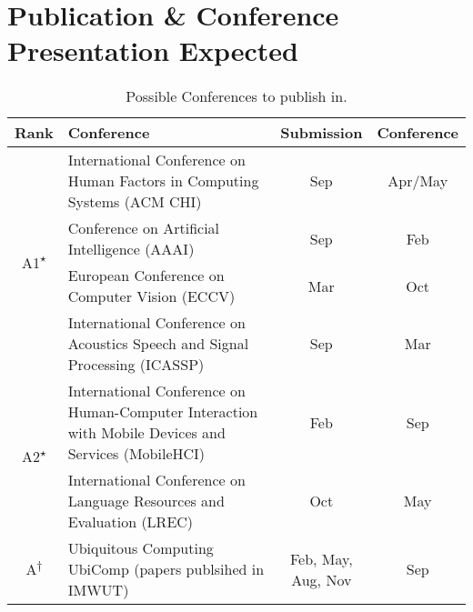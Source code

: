 \section{Publication \& Conference Presentation Expected}


\begin{sidewaystable}[]
\centering
\caption{Possible Conferences to publish in.}
\label{my-label}
\begin{tabular}{c  m{16cm}  c  c}
	\toprule
Rank                              & Conference                                                                                               & Submission         & Conference \\
\midrule
\multirow{4}{*}{A1\textsuperscript{$\star$}} & International Conference on Human Factors in Computing Systems (ACM CHI)                                 & Sep                & Apr/May    \\ \cmidrule{2-4}
                                  & Conference on Artificial Intelligence (AAAI)                                                             & Sep                & Feb        \\ \cmidrule{2-4}
                                  & European Conference on Computer Vision (ECCV)                                                            & Mar                & Oct        \\ \cmidrule{2-4}
                                  & International Conference on Acoustics Speech and Signal Processing (ICASSP)                              & Sep                & Mar        \\ 
\midrule                                  
\multirow{2}{*}{A2\textsuperscript{$\star$}} & International Conference on Human-Computer Interaction with Mobile Devices and Services (MobileHCI)      & Feb                & Sep        \\ \cmidrule{2-4}
                                  & International Conference on Language Resources and Evaluation (LREC)                                     & Oct                & May        \\
\midrule                                  
\multirow{4}{*}{A\textsuperscript{$\dagger$}}          & Ubiquitous Computing UbiComp (papers publsihed in IMWUT)                                                 & \shortstack{Feb, May,\\ Aug, Nov} & Sep        \\ \cmidrule{2-4}

\end{tabular}
\end{sidewaystable}
